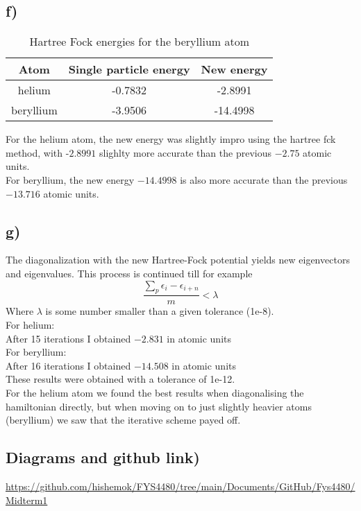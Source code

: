 \documentclass[a4paper,12pt]{article}
\begin{document}
\subsection*{f)}
\begin{table}[h]
    \centering
    \begin{tabular}{|c|c|c|}
    \hline
    Atom & Single particle energy & New energy \\
    \hline
    helium & -0.7832 & -2.8991 \\
    beryllium & -3.9506 & -14.4998 \\
    \hline
    \end{tabular}
    \caption{Hartree Fock energies for the beryllium atom}
    \label{tab:my_label}
\end{table}
For the helium atom, the new energy was slightly impro using the hartree fck method, with -$2.8991$ slighlty more accurate than the previous $-2.75$ atomic units.\\
For beryllium, the new energy $-14.4998$ is also more accurate than the previous $-13.716$ atomic units.\\
\subsection*{g)}
The diagonalization with the new Hartree-Fock potential yields new eigenvectors and eigenvalues. This process is continued till for example
$$\frac{∑_{p}^{}ϵ_i - ϵ_{i+n}}{m} < λ $$
Where $λ$ is some number smaller than a given tolerance (1e-8).\\
For helium:\\
After 15 iterations I obtained $-2.831$ in atomic units\\
For beryllium:\\
After 16 iterations I obtained $-14.508$ in atomic units\\
These results were obtained with a tolerance of 1e-12.\\
For the helium atom we found the best results when diagonalising the  hamiltonian directly, but when moving on to just slightly heavier atoms (beryllium) we saw that the iterative scheme payed off.\\

\subsection*{Diagrams and github link)}

\url{https://github.com/hishemok/FYS4480/tree/main/Documents/GitHub/Fys4480/Midterm1}
\end{document}
